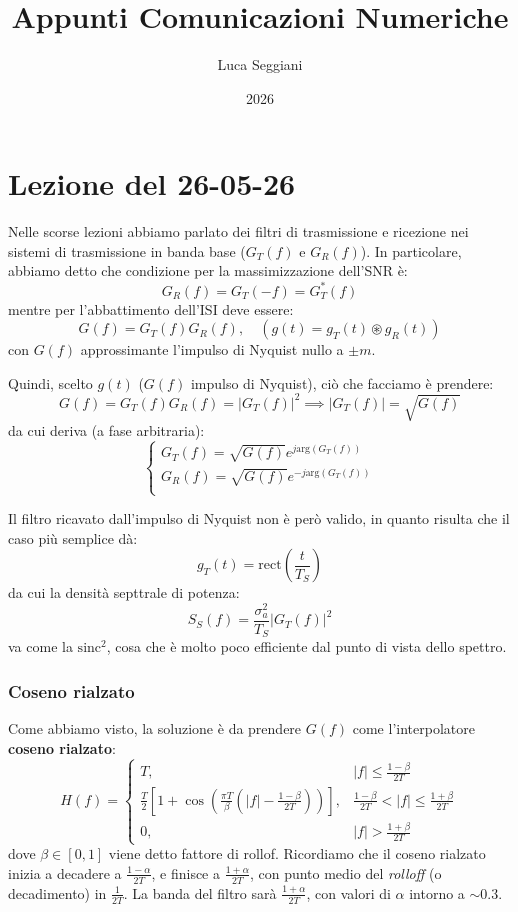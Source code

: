 \documentclass[a4paper,11pt]{article}
\title{Appunti Comunicazioni Numeriche}
\author{Luca Seggiani}
\date{2026}
\begin{document}
\section{Lezione del 26-05-26}

\thispagestyle{empty}
\pagestyle{fancy}

Nelle scorse lezioni abbiamo parlato dei filtri di trasmissione e ricezione nei sistemi di trasmissione in banda base ($G_T(f)$ e $G_R(f)$). In particolare, abbiamo detto che condizione per la massimizzazione dell'SNR è:
$$
G_R(f) = G_T(-f) = G_T^*(f)
$$
mentre per l'abbattimento dell'ISI deve essere:
$$
G(f) = G_T(f) G_R(f), \quad \left( g(t) = g_T(t) \circledast g_R(t) \right)
$$
con $G(f)$ approssimante l'impulso di Nyquist nullo a $\pm m$.

Quindi, scelto $g(t)$ ($G(f)$ impulso di Nyquist), ciò che facciamo è prendere:
$$
G(f) = G_T(f) G_R(f) = |G_T(f)|^2 \implies |G_T(f)| = \sqrt{G(f)}
$$
da cui deriva (a fase arbitraria):
$$
\begin{cases}
	G_T(f) = \sqrt{G(f)} e^{j \mathrm{arg}(G_T(f))} \\
	G_R(f) = \sqrt{G(f)} e^{-j \mathrm{arg}(G_T(f))} \\
\end{cases}
$$

Il filtro ricavato dall'impulso di Nyquist non è però valido, in quanto risulta che il caso più semplice dà:
$$
g_T(t) = \mathrm{rect} \left( \frac{t}{T_S} \right)
$$
da cui la densità septtrale di potenza:
$$
S_S(f) = \frac{\sigma_a^2}{T_S} |G_T(f) |^2
$$
va come la $\mathrm{sinc}^2$, cosa che è molto poco efficiente dal punto di vista dello spettro.

\subsubsection{Coseno rialzato}
Come abbiamo visto, la soluzione è da prendere $G(f)$ come l'interpolatore \textbf{coseno rialzato}:
$$
H(f)=
\begin{cases}
T, & |f|\le \frac{1-\beta}{2T} \\[6pt]
\frac{T}{2}\left[1+\cos\left(\frac{\pi T}{\beta}\left(|f|-\frac{1-\beta}{2T}\right)\right)\right], 
& \frac{1-\beta}{2T}<|f|\le \frac{1+\beta}{2T} \\[10pt]
0, & |f|>\frac{1+\beta}{2T}
\end{cases}
$$
dove $\beta \in [0, 1]$ viene detto fattore di rollof. Ricordiamo che il coseno rialzato inizia a decadere a $\frac{1 - \alpha}{2T}$, e finisce a $\frac{1 + \alpha}{2 T}$, con punto medio del \textit{rolloff} (o decadimento) in $\frac{1}{2T}$. La banda del filtro sarà $\frac{1 + \alpha}{2T}$, con valori di $\alpha$ intorno a $\sim 0.3$.
\end{document}
